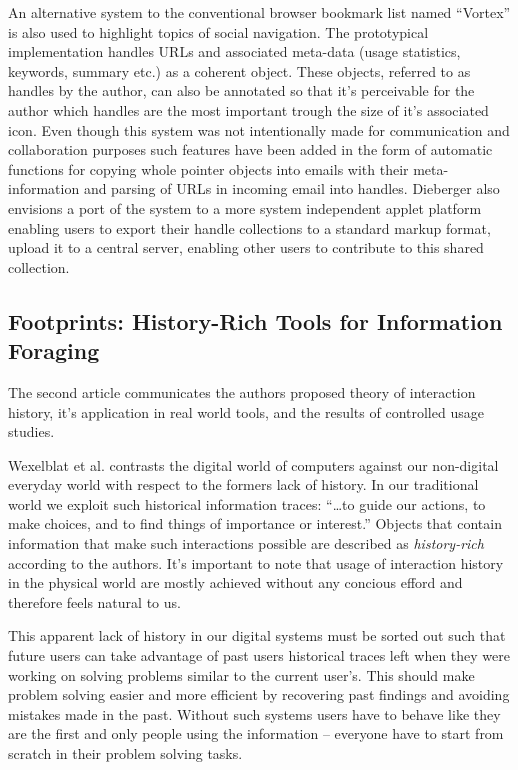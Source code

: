 \documentclass[12pt,a4paper]{article}
\begin{document}
An alternative system to the conventional browser bookmark list
named ``Vortex'' is also used to highlight topics of social navigation. The
prototypical implementation handles URLs and associated meta-data (usage
statistics, keywords, summary etc.) as a coherent object. These objects,
referred to as handles by the author, can also be annotated so that it's
perceivable for the author which handles are the most important trough the
size of it's associated icon. Even though this system was not intentionally
made for communication and collaboration purposes such features have been
added in the form of automatic functions for copying whole pointer objects
into emails with their meta-information and parsing of URLs in incoming email
into handles. Dieberger also envisions a port of the system to a more system
independent applet platform enabling users to export their handle collections
to a standard markup format, upload it to a central server, enabling other
users to contribute to this shared collection.

\subsection{Footprints: History-Rich Tools for Information Foraging}

The second article \cite{wexelblat99} communicates the authors proposed theory
of interaction history, it's application in real world tools, and the results
of controlled usage studies. 

Wexelblat et al. contrasts the digital world of computers against our
non-digital everyday world with respect to the formers lack of history. In our
traditional world we exploit such historical information traces:
``\ldots to guide our actions, to make choices, and to find things of
importance or interest.'' \cite{wexelblat99}
Objects that contain information that make such interactions possible are
described as \emph{history-rich} according to the authors. It's important to
note that usage of interaction history in the physical world are mostly
achieved without any concious efford and therefore feels natural to us.

This apparent lack of history in our digital systems must be sorted out such
that future users can take advantage of past users historical traces left when
they were working on solving problems similar to the current user's. This
should make problem solving easier and more efficient by recovering past
findings and avoiding mistakes made in the past. Without such systems users
have to behave like they are the first and only people using the information
-- everyone have to start from scratch in their problem solving tasks.
\end{document}
